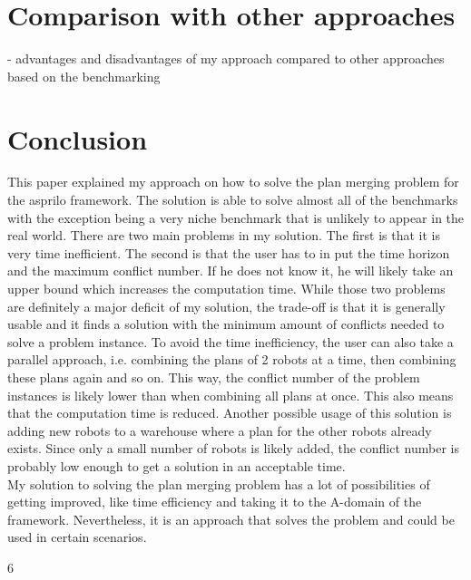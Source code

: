 \documentclass[runningheads]{llncs}
\begin{document}
\section{Comparison with other approaches}
 - advantages and disadvantages of my approach compared to other approaches based on the benchmarking

\section{Conclusion}
This paper explained my approach on how to solve the plan merging problem for the asprilo framework. The solution is able to solve almost all of the benchmarks with the exception being a very niche 
benchmark that is unlikely to appear in the real world. There are two main problems in my solution. The first is that it is very time inefficient. The second is that the user has to in put the time horizon and
the maximum conflict number. If he does not know it, he will likely take an upper bound which increases the computation time. While those two problems are definitely a major deficit of my solution, the trade-off
is that it is generally usable and it finds a solution with the minimum amount of conflicts needed to solve a problem instance. To avoid the time inefficiency, the user can also take a parallel approach, i.e. combining 
the plans of 2 robots at a time, then combining these plans again and so on. This way, the conflict number of the problem instances is likely lower than when combining all plans at once. This also means that the computation time
is reduced. Another possible usage of this solution is adding new robots to a warehouse where a plan for the other robots already exists. Since only a small number of robots is likely added, the conflict number is probably low
enough to get a solution in an acceptable time. \\
My solution to solving the plan merging problem has a lot of possibilities of getting improved, like time efficiency and taking it to the A-domain of the framework. Nevertheless, it is an approach that solves the problem and could
be used in certain scenarios.

\begin{thebibliography} {6}

\end{thebibliography}
\end{document}
